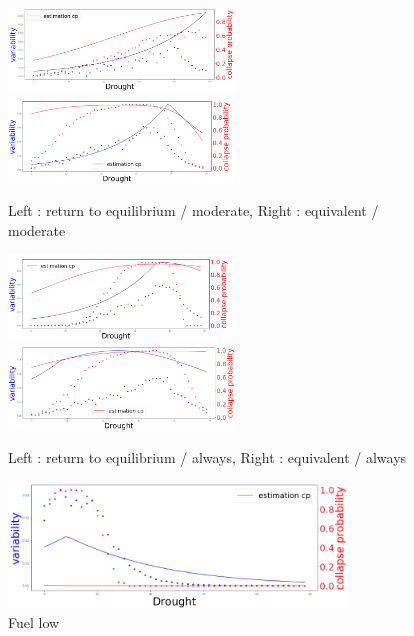 \documentclass{article}
\begin{document}
\newpage

\begin{figure}[h]
\begin{center}
\includegraphics[width=6cm]{results/drought/return_moderate.png}
\includegraphics[width=6cm]{results/drought/equivalent_moderate.png}
\end{center}
\caption{\label{fig:temp}Left : return to equilibrium / moderate, Right : equivalent / moderate}
\end{figure}

\begin{figure}[h]
\begin{center}
\includegraphics[width=6cm]{results/drought/return_always.png}
\includegraphics[width=6cm]{results/drought/equivalent_always.png}
\end{center}
\caption{\label{fig:temp}Left : return to equilibrium / always, Right : equivalent / always}
\end{figure}

\begin{figure}[h]
\begin{center}
\includegraphics[width=9cm]{results/drought/fuel_low.png}
\end{center}
\caption{\label{fig:temp}Fuel low}
\end{figure}
\end{document}
